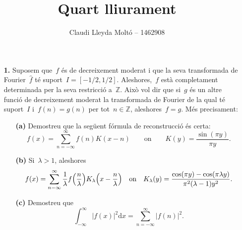 \documentclass[a4paper]{article}
\title{Quart lliurament}
\author{Claudi Lleyda Moltó -- 1462908}
\theoremstyle{plain}
\theoremstyle{definition}
\providecommand{\uppi}{\pi}
\newcommand{\diff}{\mathrm{d}}
\newcommand{\abs}[1]{\lvert{#1}\rvert}
\newcommand{\ZZ}{\mathbb{Z}}
\begin{document}
\maketitle

\begin{enumerate}
    \item[\textbf{1.}] Suposem que~\(f\) és de decreixement moderat i que la
        seva transformada de Fourier~\(\widehat{f}\) té suport~\(I=[-1/2,1/2]\).
        Aleshores,~\(f\) està completament determinada per la seva restricció
        a~\(\ZZ\).
        Això vol dir que si~\(g\) és un altre funció de decreixement moderat la
        transformada de Fourier de la qual té suport~\(I\) i~\(f(n)=g(n)\) per
        tot~\(n\in\ZZ\), aleshores~\(f=g\).
        Més precisament:
        \begin{enumerate}
            \item[\textbf{(a)}] Demostreu que la següent fórmula de reconstrucció
                és certa:
                \[
                    f(x) = \sum_{n=-\infty}^{\infty} f(n) K(x-n)
                    \qquad\text{on}\qquad
                    K(y) = \frac{\sin(\uppi y)}{\uppi y}.
                \]
        \end{enumerate}
\end{enumerate}

\begin{enumerate}
    \item[]\begin{enumerate}
        \item[\textbf{(b)}] Si~\(\lambda > 1\), aleshores
            \[
                f(x) =
                \sum_{n-\infty}^{\infty}
                \frac{1}{\lambda} f\Bigl(\frac{n}{\lambda}\Bigr)
                K_{\lambda}\Bigl(x-\frac{n}{\lambda}\Bigr)
                \quad\text{on}\quad
                K_{\lambda}(y) =
                \frac{\cos(\uppi y) - \cos(\uppi\lambda y)}
                {\uppi^{2}(\lambda-1)y^{2}}.
            \]
    \end{enumerate}
\end{enumerate}

\begin{enumerate}
    \item[]\begin{enumerate}
        \item[\textbf{(c)}] Demostreu que
            \[
                \int_{-\infty}^{\infty}
                \abs{f(x)}^{2}
                \diff x
                =
                \sum_{n=-\infty}^{\infty}
                \abs{f(n)}^{2}.
            \]
    \end{enumerate}
\end{enumerate}
\end{document}
